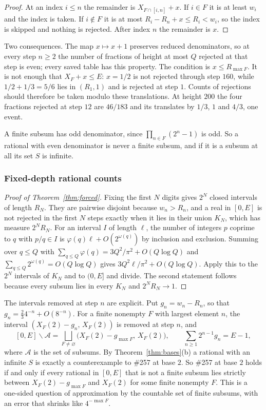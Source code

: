 \documentclass[11pt]{article}
\begin{document}
\begin{proof}
At an index $i\le n$ the remainder is $X_{F\cap[i,n]}+x$.  If $i\in F$ it is at
least $w_i$ and the index is taken.  If $i\notin F$ it is at most
$R_i-R_n+x\le R_i<w_i$, so the index is skipped and nothing is rejected.  After
index $n$ the remainder is $x$.
\end{proof}

Two consequences.  The map $x\mapsto x+1$ preserves reduced denominators, so at
every step $n\ge2$ the number of fractions of height at most $Q$ rejected at
that step is even; every saved table has this property.  The condition is
$x\le R_{\max F}$.  It is not enough that $X_F+x\le E$: $x=1/2$ is not rejected
through step $160$, while $1/2+1/3=5/6$ lies in $(R_1,1)$ and is rejected at
step $1$.  Counts of rejections should therefore be taken modulo these
translations.  At height $200$ the four fractions rejected at step $12$ are
$46/183$ and its translates by $1/3$, $1$ and $4/3$, one event.

A finite subsum has odd denominator, since $\prod_{n\in F}(2^n-1)$ is odd.  So a
rational with even denominator is never a finite subsum, and if it is a subsum
at all its set $S$ is infinite.


\subsubsection{Fixed-depth rational counts}


\begin{proof}[Proof of Theorem~\ref{thm:forced}]
Fixing the first $N$ digits gives $2^N$ closed intervals of length $R_N$.
They are pairwise disjoint because $w_n>R_n$, and a real in $[0,E]$ is not
rejected in the first $N$ steps exactly when it lies in their union $K_N$,
which has measure $2^NR_N$.  For an interval $I$ of length $\ell$, the number
of integers $p$ coprime to $q$ with $p/q\in I$ is
$\varphi(q)\ell+O(2^{\omega(q)})$ by inclusion and exclusion.  Summing over
$q\le Q$ with $\sum_{q\le Q}\varphi(q)=3Q^2/\pi^2+O(Q\log Q)$ and
$\sum_{q\le Q}2^{\omega(q)}=O(Q\log Q)$ gives $3Q^2\ell/\pi^2+O(Q\log Q)$.
Apply this to the $2^N$ intervals of $K_N$ and to $(0,E]$ and divide.  The
second statement follows because every subsum lies in every $K_N$ and
$2^NR_N\to1$.
\end{proof}

The intervals removed at step $n$ are explicit.  Put $g_n=w_n-R_n$, so that
$g_n=\tfrac23 4^{-n}+O(8^{-n})$.  For a finite nonempty $F$ with largest element
$n$, the interval $(X_F(2)-g_n,\,X_F(2))$ is removed at step $n$, and
\[
 [0,E]\smallsetminus\mathcal A=\bigsqcup_{F\ne\varnothing}\bigl(X_F(2)-g_{\max F},\,X_F(2)\bigr),
 \qquad\sum_{n\ge1}2^{n-1}g_n=E-1,
\]
where $\mathcal A$ is the set of subsums.  By Theorem~\ref{thm:bases}(b) a
rational with an infinite $S$ is exactly a counterexample to \#257 at base $2$.
So \#257 at base $2$ holds if and only if every rational in $[0,E]$ that is not
a finite subsum lies strictly between $X_F(2)-g_{\max F}$ and $X_F(2)$ for some
finite nonempty $F$.
This is a one-sided question of approximation by the countable set of finite
subsums, with an error that shrinks like $4^{-\max F}$.
\end{document}
